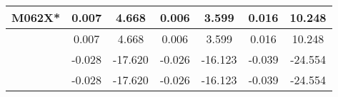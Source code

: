 \begin{tabular}{|c| c |c | c | c | c | c |}
    \multicolumn{1}{|c|}{ M062X*}                               & 0.007                                            & 4.668                                        & 0.006                                            & 3.599                                      & 0.016                                            & 10.248                 \\ \hline
                                                                                   & 0.007                                            & 4.668                                        & 0.006                                            & 3.599                                      & 0.016                                            & 10.248                 \\ \hline
                                                                                   & -0.028                                           & -17.620                                      & -0.026                                           & -16.123                                    & -0.039                                           & -24.554                \\ \hline
                                                                                   &   -0.028 & -17.620                                      &   -0.026 & -16.123                                    &   -0.039 & -24.554                \\ \hline
\end{tabular}
